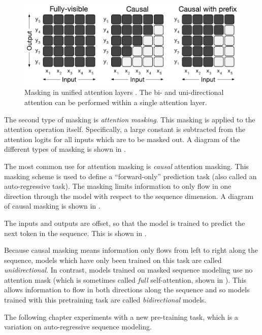 \begin{figure}
    \includegraphics[width=\linewidth]{figures/attention_masks.pdf}
    \caption[Attention Masks]{Masking in unified attention layers \cite{unilm,t5}. The bi- and uni-directional attention can be performed within a single attention layer.}
    \hrulefill
    \label{fig:unified-masking}
\end{figure}

The second type of masking is \textit{attention masking}. This masking is applied to the attention operation itself. Specifically, a large constant is subtracted from the attention logits for all inputs which are to be masked out. A diagram of the different types of masking is shown in .

The most common use for attention masking is \textit{causal} attention masking. This masking scheme is used to define a ``forward-only'' prediction task (also called an auto-regressive task). The masking limits information to only flow in one direction through the model with respect to the sequence dimension. A diagram of causal masking is shown in .

The inputs and outputs are offset, so that the model is trained to predict the next token in the sequence. This is shown in .

Because causal masking means information only flows from left to right along the sequence, models which have only been trained on this task are called \textit{unidirectional}. In contrast, models trained on masked sequence modeling use no attention mask (which is sometimes called \textit{full} self-attention, shown in ). This allows information to flow in both directions along the sequence and so models trained with this pretraining task are called \textit{bidirectional} models.

The following chapter experiments with a new pre-training task, which is a variation on auto-regressive sequence modeling.

